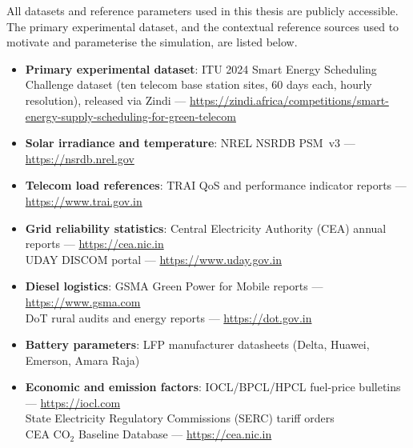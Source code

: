 
\label{app:data-sources}

All datasets and reference parameters used in this thesis are publicly
accessible. The primary experimental dataset, and the contextual
reference sources used to motivate and parameterise the simulation, are
listed below.

\begin{itemize}[leftmargin=*]
    \item \textbf{Primary experimental dataset}:
    ITU 2024 Smart Energy Scheduling Challenge dataset (ten telecom base
    station sites, 60 days each, hourly resolution), released via Zindi
    \citep{itu2024zindi} —
    \url{https://zindi.africa/competitions/smart-energy-supply-scheduling-for-green-telecom}

    \item \textbf{Solar irradiance and temperature}:  
    NREL NSRDB PSM~v3 — \url{https://nsrdb.nrel.gov}

    \item \textbf{Telecom load references}:  
    TRAI QoS and performance indicator reports — \url{https://www.trai.gov.in}

    \item \textbf{Grid reliability statistics}:  
    Central Electricity Authority (CEA) annual reports — \url{https://cea.nic.in} \\
    UDAY DISCOM portal — \url{https://www.uday.gov.in}

    \item \textbf{Diesel logistics}:  
    GSMA Green Power for Mobile reports — \url{https://www.gsma.com} \\
    DoT rural audits and energy reports — \url{https://dot.gov.in}

    \item \textbf{Battery parameters}:  
    LFP manufacturer datasheets (Delta, Huawei, Emerson, Amara Raja)

    \item \textbf{Economic and emission factors}:  
    IOCL/BPCL/HPCL fuel-price bulletins — \url{https://iocl.com} \\
    State Electricity Regulatory Commissions (SERC) tariff orders \\
    CEA CO$_2$ Baseline Database — \url{https://cea.nic.in}
\end{itemize}
